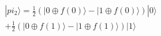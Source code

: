 \documentclass[preview]{standalone}
\begin{document}
\begin{align*}
|pi_2\rangle = \frac{1}{2} (|0 \oplus f(0) \rangle - |1 \oplus f(0) \rangle) |0\rangle \\ + \frac{1}{2}(|0\oplus f(1) \rangle - |1 \oplus f(1) \rangle)|1\rangle
\end{align*}
\end{document}
